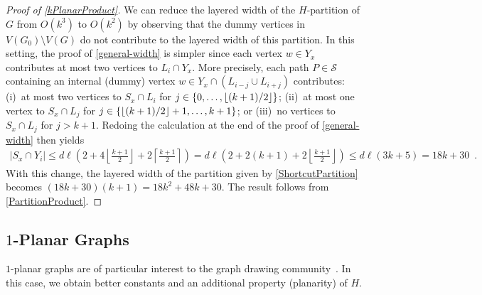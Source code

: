 \documentclass{patmorin}
\theoremstyle{plain}
\theoremstyle{definition}
\DeclarePairedDelimiter{\floor}{\lfloor}{\rfloor}
\renewcommand{\SS}{\mathcal{S}}
\renewcommand{\le}{\leqslant}
\begin{document}
\begin{proof}[Proof of \cref{kPlanarProduct}]
	We can reduce the layered width of the $H$-partition of $G$ from $O(k^3)$ to $O(k^2)$ by observing that the dummy vertices in $V(G_0)\setminus V(G)$ do not contribute to the layered width of this partition.  In this setting, the proof of \cref{general-width} is simpler since each vertex $w\in Y_x$ contributes at most two vertices to $L_i\cap Y_x$.  More precisely, each path $P\in\SS$ containing an internal (dummy) vertex $w\in Y_x\cap (L_{i-j}\cup L_{i+j})$ contributes: (i)~at most two vertices to $S_x\cap L_i$ for $j\in\{0,\ldots,\floor{(k+1)/2}\}$; (ii)~at most one vertex to $S_x\cap L_j$ for $j\in\{\floor{(k+1)/2}+1,\ldots,k+1\}$; or (iii)~no vertices to $S_x\cap L_j$ for $j > k+1$.
	Redoing the calculation at the end of the proof of \cref{general-width} then yields
	\begin{align*}
	|S_x\cap Y_i| \le d\ell\left(
	2
	+ 4\left\lfloor\tfrac{k+1}{2}\right\rfloor
	+ 2\left\lceil\tfrac{k+1}{2}\right\rceil
	\right)
	 =
	d\ell\left(
	2 + 2(k+1) + 2\left\lfloor\tfrac{k+1}{2}\right\rfloor
	\right)
	 \le
	d\ell(3k+5)
	= 18k+30 \enspace .
	\end{align*}
	With this change, the layered width of the partition given by \cref{ShortcutPartition} becomes $(18k+30)(k+1)=18k^2+48k+30$.
	The result follows from \cref{PartitionProduct}.
\end{proof}

\subsection{\boldmath $1$-Planar Graphs}
\label{sec-1-planar}

$1$-planar graphs are of particular interest to the graph drawing community~\citep{kobourov.liotta.ea:annotated}. In this case, we obtain better constants and an additional property (planarity) of $H$.

%
\end{document}
